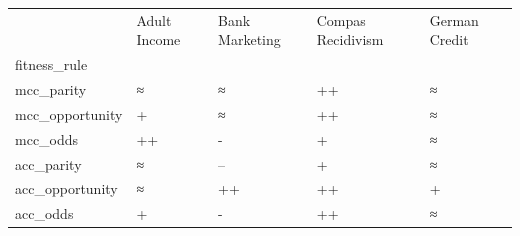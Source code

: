 \begin{tabular}{lllll}
\toprule
 & Adult Income & Bank Marketing & Compas Recidivism & German Credit \\
fitness_rule &  &  &  &  \\
\midrule
mcc_parity & ≈ & ≈ & ++ & ≈ \\
mcc_opportunity & + & ≈ & ++ & ≈ \\
mcc_odds & ++ & - & + & ≈ \\
acc_parity & ≈ & -- & + & ≈ \\
acc_opportunity & ≈ & ++ & ++ & + \\
acc_odds & + & - & ++ & ≈ \\
\bottomrule
\end{tabular}
